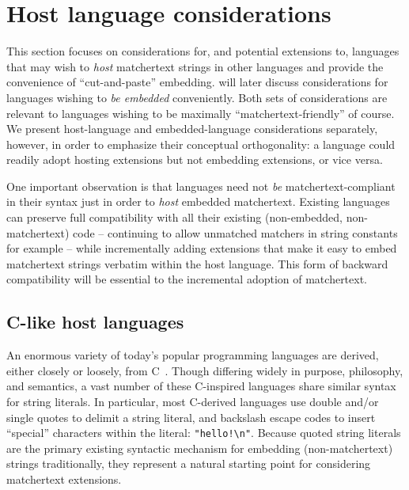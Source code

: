 \section{Host language considerations}
\label{sec:host}

This section focuses on considerations for,
and potential extensions to,
languages that may wish to \emph{host}
matchertext strings in other languages
and provide the convenience of ``cut-and-paste'' embedding.
 will later discuss considerations
for languages wishing to \emph{be embedded} conveniently.
Both sets of considerations are relevant
to languages wishing to be maximally ``matchertext-friendly'' of course.
We present host-language and embedded-language considerations separately,
however,
in order to emphasize their conceptual orthogonality:
a language could readily adopt hosting extensions but not embedding extensions,
or vice versa.

One important observation is that
languages need not \emph{be} matchertext-compliant in their syntax
just in order to \emph{host} embedded matchertext.
Existing languages can preserve full compatibility
with all their existing (non-embedded, non-matchertext) code --
continuing to allow unmatched matchers in string constants for example --
while incrementally adding extensions that make it easy
to embed matchertext strings verbatim within the host language.
This form of backward compatibility will be essential
to the incremental adoption of matchertext.


\subsection{C-like host languages}
\label{sec:host:c}

An enormous variety of today's popular programming languages
are derived, either closely or loosely, from C~\cite{kernighan88c}.
Though differing widely in purpose, philosophy, and semantics,
a vast number of these C-inspired languages share similar syntax
for string literals.
In particular, most C-derived languages use
double and/or single quotes to delimit a string literal,
and backslash escape codes to insert ``special'' characters within the literal:
\eg \verb|"hello!\n"|.
Because quoted string literals
are the primary existing syntactic mechanism
for embedding (non-matchertext) strings traditionally,
they represent a natural starting point for considering matchertext extensions.

